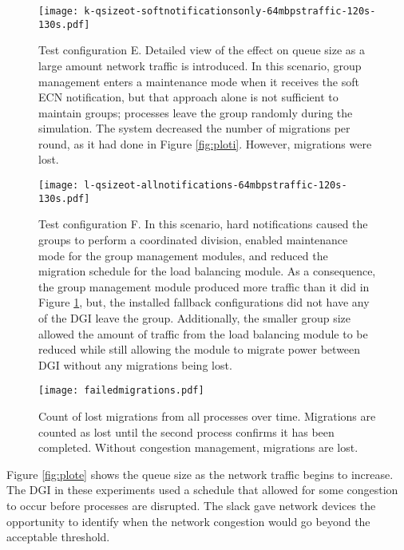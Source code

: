 \begin{figure}
\centering
\texttt{[image: k-qsizeot-softnotificationsonly-64mbpstraffic-120s-130s.pdf]}
\caption[Detailed view of the effect on queue size as a large amount network traffic is introduced.]{
    Test configuration E.
Detailed view of the effect on queue size as a large amount network traffic is introduced.
In this scenario, group management enters a maintenance mode when it receives the soft \ac{ECN} notification, but that approach alone is not sufficient to maintain groups; processes leave the group randomly during the simulation.
The system decreased the number of migrations per round, as it had done in Figure \ref{fig:ploti}.
However, migrations were lost.
}
\label{fig:plotk}
\centering
\end{figure}

\begin{figure}
\centering
\texttt{[image: l-qsizeot-allnotifications-64mbpstraffic-120s-130s.pdf]}
\caption[Effect on queue size as a large amount of network traffic is introduced.]
{
    Test configuration F.
In this scenario, hard notifications caused the groups to perform a coordinated division, enabled maintenance mode for the group management modules, and reduced the migration schedule for the load balancing module.
As a consequence, the group management module produced more traffic than it did in Figure \ref{fig:plotk}, but, the installed fallback configurations did not have any of the \ac{DGI} leave the group.
Additionally, the smaller group size allowed the amount of traffic from the load balancing module to be reduced while still allowing the module to migrate power between \ac{DGI} without any migrations being lost.
}
\label{fig:plotl}
\end{figure}

\begin{figure}
\centering
\texttt{[image: failedmigrations.pdf]}
\caption[Count of lost migrations from all processes over time.]{Count of lost migrations from all processes over time. Migrations are counted as lost until the second process confirms it has been completed. Without congestion management, migrations are lost.}
\label{fig:plotg}
\end{figure}

Figure \ref{fig:plote} shows the queue size as the network traffic begins to increase.
The \ac{DGI} in these experiments used a schedule that allowed for some congestion to occur before processes are disrupted.
The slack gave network devices the opportunity to identify when the network congestion would go beyond the acceptable threshold.

